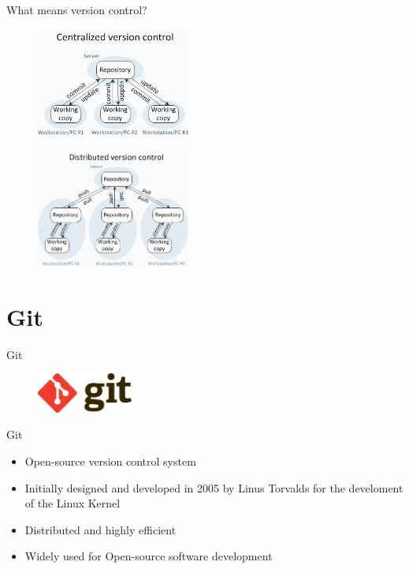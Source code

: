 \documentclass[10pt]{beamer}
\begin{document}
\begin{frame}{What means version control?}
    	\begin{figure}[t]
      \includegraphics[width=0.45\textwidth]{centralized_version_control.png}
    \end{figure}
    \begin{figure}[t]
      \includegraphics[width=0.45\textwidth]{dist_version_control.png}
    \end{figure}
\end{frame}

\section{Git}

\begin{frame}{Git}
    	\begin{figure}[t]
      \includegraphics[width=0.28\textwidth]{git_logo.png}
    \end{figure}
    \begin{alertblock}{Git}
     \begin{itemize}
       \item Open-source version control system
       \item Initially designed and developed in 2005 by Linus Torvalds for the develoment of the Linux Kernel
       \item Distributed and highly efficient
       \item Widely used for Open-source software development 
      \end{itemize}
    \end{alertblock}
\end{frame}
\end{document}
